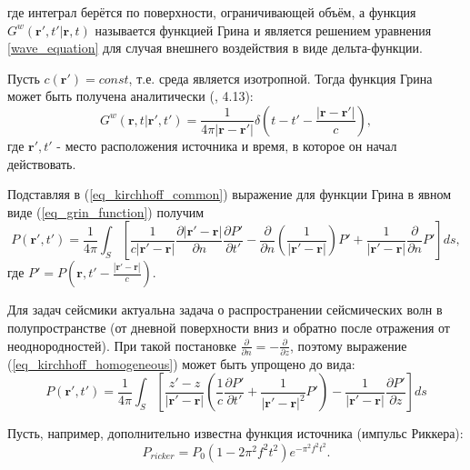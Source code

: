 \documentclass{article}
\renewcommand{\vec     } [1]     { \bm{#1}           }
\begin{document}
где интеграл берётся по поверхности, ограничивающей объём, а функция $G^w(\vec{r'}, t' | \vec{r}, t)$ называется функцией Грина и является решением уравнения \ref{wave_equation} для случая внешнего воздействия в виде дельта-функции.

Пусть $c(\vec{r'}) = const$, т.е. среда является изотропной.
Тогда функция Грина может быть получена аналитически (\cite{Zhdanov_1988}, 4.13):
\begin{equation}
\label{eq_grin_function}
G^w(\vec{r}, t | \vec{r'}, t') = \frac{1}{4\pi|\vec{r} - \vec{r'}|}\delta(t - t' - \frac{|\vec{r} -
\vec{r'}|}{c}),
\end{equation}
где $\vec{r'}, t'$ - место расположения источника и время, в которое он начал действовать.

Подставляя в (\ref{eq_kirchhoff_common}) выражение для функции Грина в явном виде (\ref{eq_grin_function}) получим
\begin{equation}
\label{eq_kirchhoff_homogeneous}
P(\vec{r'}, t') = \frac{1}{4\pi} \int_S [\frac{1}{c|\vec{r'} - \vec{r}|}
\frac{\partial |\vec{r'} - \vec{r}|}{\partial n}\frac{\partial P'}{\partial t'}
- \frac{\partial}{\partial n}(\frac{1}{|\vec{r'} - \vec{r}|}) P' + 
\frac{1}{|\vec{r'} - \vec{r}|}\frac{\partial}{\partial n}P'] ds,
\end{equation}
где $P' = P(\vec{r}, t' - \frac{|\vec{r'} - \vec{r}|}{c})$.
 
Для задач сейсмики актуальна задача о распространении сейсмических волн в полупространстве (от дневной поверхности вниз и обратно после отражения от неоднородностей).
При такой постановке $\frac{\partial}{\partial n} = -\frac{\partial}{\partial z}$, поэтому выражение (\ref{eq_kirchhoff_homogeneous}) может быть упрощено до вида:
\begin{equation}
\label{eq_kirchhoff_final}
P(\vec{r'}, t') = \frac{1}{4\pi} \int_S [\frac{z' - z}{|\vec{r'} - \vec{r}|}(\frac{1}{c}
\frac{\partial P'}{\partial t'} + \frac{1}{|\vec{r'} - \vec{r}|^2} P') - \frac{1}{|\vec{r'}
- \vec{r}|}\frac{\partial P'}{\partial z}] ds
\end{equation}

Пусть, например, дополнительно известна функция источника (импульс Риккера):
\begin{equation}
\label{eq_ricker_wavelet}
P_{ricker} = P_0(1-2 \pi^2f^2t^2)e^{-\pi^2f^2t^2}.
\end{equation}
\end{document}
